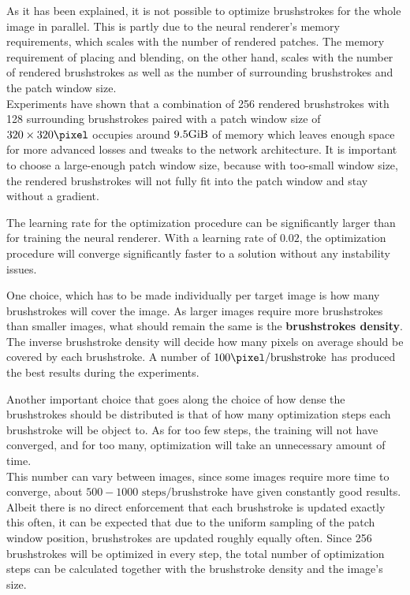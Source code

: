 As it has been explained, it is not possible to optimize brushstrokes for the whole image in parallel.
This is partly due to the neural renderer's memory requirements, which scales with the number of rendered patches.
The memory requirement of placing and blending, on the other hand, scales with the number of rendered brushstrokes as well as the number of surrounding brushstrokes and the patch window size.\\
Experiments have shown that a combination of 256 rendered brushstrokes with 128 surrounding brushstrokes paired with a patch window size of $320
\times320 \si{\pixel}$ occupies around $9.5 \si{\gibi \byte}$ of memory which leaves enough space for more advanced losses and tweaks to the network architecture.
It is important to choose a large-enough patch window size, because with too-small window size, the rendered brushstrokes will not fully fit into the patch window and stay without a gradient.

The learning rate for the optimization procedure can be significantly larger than for training the neural renderer.
With a learning rate of $0.02$, the optimization procedure will converge significantly faster to a solution without any instability issues.

One choice, which has to be made individually per target image is how many brushstrokes will cover the image.
As larger images require more brushstrokes than smaller images, what should remain the same is the \textbf{brushstrokes density}.
The inverse brushstroke density will decide how many pixels on average should be covered by each brushstroke.
A number of $100 \si{\pixel}/\text{brushstroke}$ has produced the best results during the experiments.

Another important choice that goes along the choice of how dense the brushstrokes should be distributed is that of how many optimization steps each brushstroke will be object to.
As for too few steps, the training will not have converged, and for too many, optimization will take an unnecessary amount of time.\\
This number can vary between images, since some images require more time to converge, about $500 - 1000 \text{ steps}/\text{brushstroke}$ have given constantly good results.\\
Albeit there is no direct enforcement that each brushstroke is updated exactly this often, it can be expected that due to the uniform sampling of the patch window position, brushstrokes are updated roughly equally often.
Since 256 brushstrokes will be optimized in every step, the total number of optimization steps can be calculated together with the brushstroke density and the image's size.

